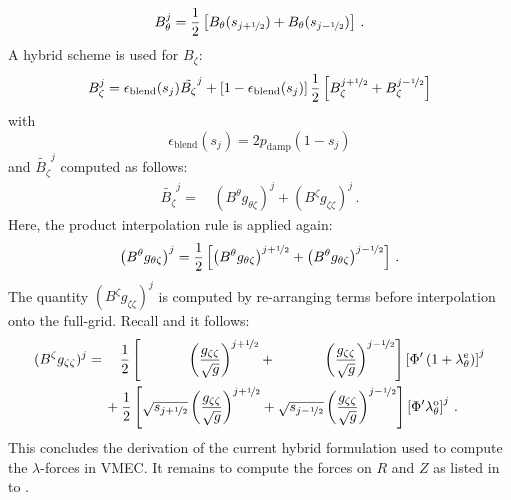 \begin{equation}
  B_\theta^j = \frac{1}{2} \left[ B_\theta(s_{j+\nicefrac{1}{2}}) + B_\theta(s_{j-\nicefrac{1}{2}}) \right] \, .
\end{equation}
A hybrid scheme is used for $B_\zeta$:
\begin{equation}
  B_\zeta^j =              \epsilon_\mathrm{blend}(s_j)                          \tilde{B_\zeta}^j
              + \left[ 1 - \epsilon_\mathrm{blend}(s_j) \right] \frac{1}{2} \left[ B_\zeta^{j+\nicefrac{1}{2}} + B_\zeta^{j-\nicefrac{1}{2}} \right]
\end{equation}
with
\begin{equation}
  \epsilon_\mathrm{blend}(s_j) = 2 p_\mathrm{damp} (1 - s_j)
\end{equation}
and $\tilde{B_\zeta}^j$ computed as follows:
\begin{align}
  \tilde{B_\zeta}^j =&\, \left( B^\theta g_{\theta \zeta } \right)^j + \left( B^\zeta g_{\zeta  \zeta } \right)^j \, .
\end{align}
Here, the product interpolation rule is applied again:
\begin{equation}
  \left( B^\theta g_{\theta \zeta } \right)^j
 = \frac{1}{2} \left[ \left( B^\theta g_{\theta \zeta } \right)^{j+\nicefrac{1}{2}} + \left( B^\theta g_{\theta \zeta } \right)^{j-\nicefrac{1}{2}} \right] \, .
\end{equation}
The quantity $(B^\zeta g_{\zeta  \zeta })^j$ is computed by re-arranging terms before interpolation onto the full-grid.
Recall  and it follows:
\begin{align}
  (B^\zeta g_{\zeta  \zeta } )^j
  =&\, \phantom{+}~
         \frac{1}{2} \left[ \phantom{\sqrt{s_{j+\half}}} \left( \frac{g_{\zeta \zeta}}{\sqrt{g}} \right)^{j+\half} + \phantom{\sqrt{s_{j-\half}}} \left( \frac{g_{\zeta \zeta}}{\sqrt{g}} \right)^{j-\half} \right]
         \left[ \Phi' \left( 1 + \lambda_\theta^\mathrm{e} \right) \right]^j \nonumber \\
  ~&\, +
         \frac{1}{2} \left[ \sqrt{s_{j+\half}} \left( \frac{g_{\zeta \zeta}}{\sqrt{g}} \right)^{j+\half} + \sqrt{s_{j-\half}} \left( \frac{g_{\zeta \zeta}}{\sqrt{g}} \right)^{j-\half} \right]
         \left[ \Phi' \lambda_\theta^\mathrm{o} \right]^j \, .
\end{align}
This concludes the derivation of the current hybrid formulation used to compute the $\lambda$-forces in VMEC.
It remains to compute the forces on $R$ and $Z$ as listed in  to .

